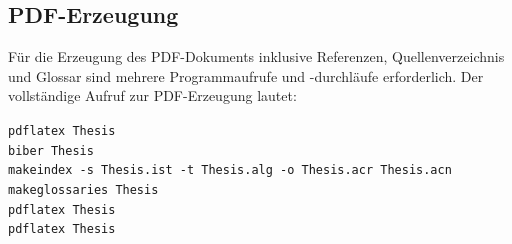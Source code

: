 \subsection{PDF-Erzeugung}

Für die Erzeugung des PDF-Dokuments inklusive Referenzen, Quellenverzeichnis und Glossar sind mehrere Programmaufrufe und -durchläufe erforderlich. Der vollständige Aufruf zur PDF-Erzeugung lautet: 

\texttt{pdflatex Thesis}\\
\texttt{biber Thesis}\\
\texttt{makeindex -s Thesis.ist -t Thesis.alg -o Thesis.acr Thesis.acn}\\
\texttt{makeglossaries Thesis}\\
\texttt{pdflatex Thesis}\\
\texttt{pdflatex Thesis}\\